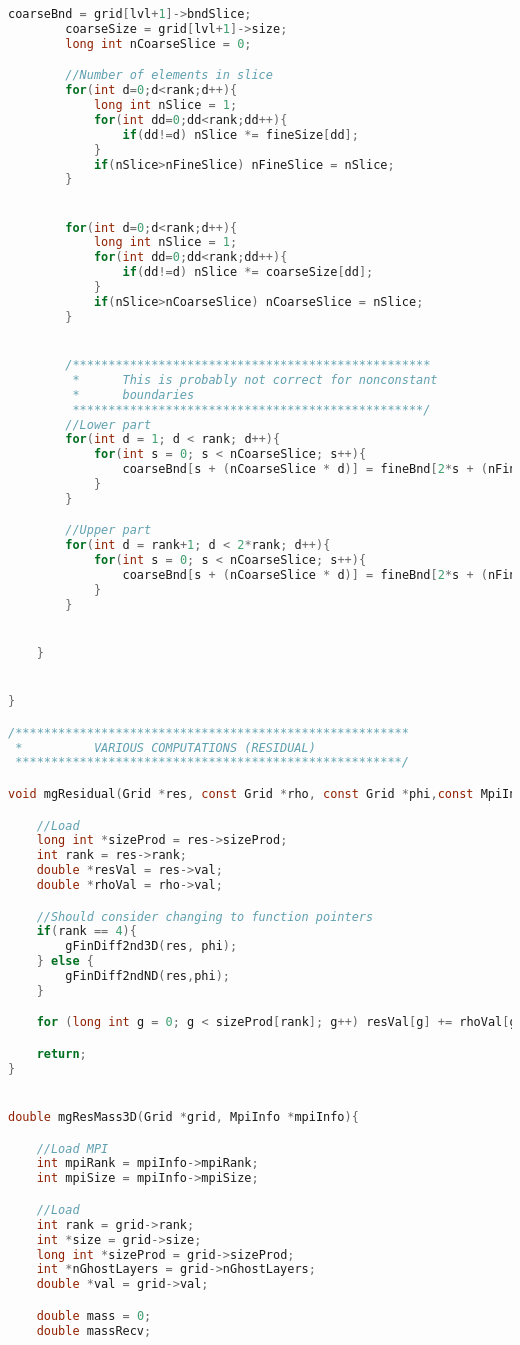 \begin{lstlisting}[language=c, caption = main routine]
		coarseBnd = grid[lvl+1]->bndSlice;
		coarseSize = grid[lvl+1]->size;
		long int nCoarseSlice = 0;

		//Number of elements in slice
		for(int d=0;d<rank;d++){
			long int nSlice = 1;
			for(int dd=0;dd<rank;dd++){
				if(dd!=d) nSlice *= fineSize[dd];
			}
			if(nSlice>nFineSlice) nFineSlice = nSlice;
		}


		for(int d=0;d<rank;d++){
			long int nSlice = 1;
			for(int dd=0;dd<rank;dd++){
				if(dd!=d) nSlice *= coarseSize[dd];
			}
			if(nSlice>nCoarseSlice) nCoarseSlice = nSlice;
		}


		/**************************************************
		 *		This is probably not correct for nonconstant
		 * 		boundaries
		 *************************************************/
		//Lower part
		for(int d = 1; d < rank; d++){
			for(int s = 0; s < nCoarseSlice; s++){
				coarseBnd[s + (nCoarseSlice * d)] = fineBnd[2*s + (nFineSlice*d)];
			}
		}

		//Upper part
		for(int d = rank+1; d < 2*rank; d++){
			for(int s = 0; s < nCoarseSlice; s++){
				coarseBnd[s + (nCoarseSlice * d)] = fineBnd[2*s + (nFineSlice*d)];
			}
		}


	}


}

/*******************************************************
 *			VARIOUS COMPUTATIONS (RESIDUAL)
 ******************************************************/

void mgResidual(Grid *res, const Grid *rho, const Grid *phi,const MpiInfo *mpiInfo){

	//Load
	long int *sizeProd = res->sizeProd;
	int rank = res->rank;
	double *resVal = res->val;
	double *rhoVal = rho->val;

	//Should consider changing to function pointers
	if(rank == 4){
		gFinDiff2nd3D(res, phi);
	} else {
		gFinDiff2ndND(res,phi);
	}

	for (long int g = 0; g < sizeProd[rank]; g++) resVal[g] += rhoVal[g];

	return;
}


double mgResMass3D(Grid *grid, MpiInfo *mpiInfo){

	//Load MPI
	int mpiRank = mpiInfo->mpiRank;
	int mpiSize = mpiInfo->mpiSize;

	//Load
	int rank = grid->rank;
	int *size = grid->size;
	long int *sizeProd = grid->sizeProd;
	int *nGhostLayers = grid->nGhostLayers;
	double *val = grid->val;

	double mass = 0;
	double massRecv;


\end{lstlisting}
